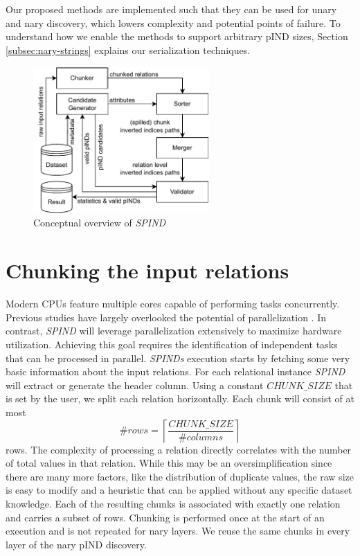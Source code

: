 Our proposed methods are implemented such that they can be used for unary and nary discovery, which lowers complexity and potential points of failure. To understand how we enable the methods to support arbitrary pIND sizes, Section \ref{subsec:nary-strings} explains our serialization techniques.

\begin{figure}[t]
    \centering
    \includegraphics[width=0.6\textwidth]{figures/SPIND.pdf}
    \caption{Conceptual overview of \textit{SPIND}}
    \label{fig:spind}
\end{figure}

\section{Chunking the input relations}\label{subsec:chunking}
Modern CPUs feature multiple cores capable of performing tasks concurrently. Previous studies have largely overlooked the potential of parallelization \cite{smirnov2023fast, papenbrock2015divide, bauckmann2006efficiently, bell1995discovery}. In contrast, \textit{SPIND} will leverage parallelization extensively to maximize hardware utilization. Achieving this goal requires the identification of independent tasks that can be processed in parallel. \textit{SPINDs} execution starts by fetching some very basic information about the input relations. For each relational instance \textit{SPIND} will extract or generate the header column. Using a constant $CHUNK\_SIZE$ that is set by the user, we split each relation horizontally. Each chunk will consist of at most 
$$\#\textit{rows} = \left \lceil \frac{CHUNK\_SIZE}{\#\textit{columns}} \right \rceil$$
rows. The complexity of processing a relation directly correlates with the number of total values in that relation. While this may be an oversimplification since there are many more factors, like the distribution of duplicate values, the raw size is easy to modify and a heuristic that can be applied without any specific dataset knowledge. Each of the resulting chunks is associated with exactly one relation and carries a subset of rows. Chunking is performed once at the start of an execution and is not repeated for nary layers. We reuse the same chunks in every layer of the nary pIND discovery.

